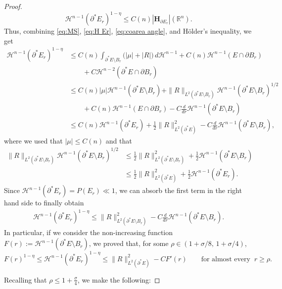 \documentclass[reqno,11pt]{amsart}
\def\sz{\sigma}
\newcommand{\R}{\mathbb R}
\numberwithin{equation}{section}
\theoremstyle{remark}
\begin{document}
\begin{proof}
\begin{equation}\label{eq:MS}
\mathscr H^{n-1}(\partial^*E_r)^{1-\eta}\le C(n)|\mathbf H_{\partial E_r}|(\R^n).    
\end{equation}
Thus, combining \eqref{eq:MS}, \eqref{eq:H Er}, \eqref{eq:coarea angle}, and 
H\"older's inequality, 
we get
\begin{align*}
\mathscr H^{n-1}(\partial^*E_r)^{1-\eta}
&\leq    C(n)\int_{\partial^*E\setminus B_{r}}\big(|\mu|+|R|\big)\, d\mathscr H^{n-1}+  C(n)\mathscr H^{n-1}(E\cap \partial B_{r})\\
&\qquad+ C  \mathscr H^{n-2}(\partial^*E\cap \partial B_{r}) \\
&\le  C(n)|\mu|\mathscr H^{n-1}(\partial^*E\setminus B_{r})+\|R\|_{L^2(\partial^*E\setminus B_{r})}\mathscr H^{n-1}(\partial^*E\setminus B_{r})^{1/2} \\
&\qquad+ C(n)\mathscr H^{n-1}(E\cap \partial B_r)-   C   \frac{d}{dr}\mathscr H^{n-1}\left(\partial^*E \setminus B_{r}\right)\\
&\leq C(n) \mathscr H^{n-1}(\partial^*E_r)+ \frac{1}2 \|R\|_{L^2(\partial^*E)}^2 -   C   \frac{d}{dr}\mathscr H^{n-1}\left(\partial^*E \setminus B_{r}\right),
\end{align*}
where we used that $|\mu|\leq C(n)$ and that
\begin{align*}
\|R\|_{L^2(\partial^*E\setminus B_{r})}\mathscr H^{n-1}(\partial^*E\setminus B_{r})^{1/2}
&\leq \frac12 \|R\|_{L^2(\partial^*E\setminus B_{r})}^2+\frac12 \mathscr H^{n-1}(\partial^*E\setminus B_{r})\\
& \leq 
\frac12 \|R\|_{L^2(\partial^*E)}^2+\frac12
\mathscr H^{n-1}(\partial^*E_r).
\end{align*}
Since $\mathscr H^{n-1}(\partial^*E_r)=P(E_r)\ll 1$, we can absorb the first term in the right hand side to finally obtain
\begin{align*}
\mathscr H^{n-1}(\partial^*E_r)^{1-\eta}\leq \|R\|_{L^2(\partial^*E\setminus B_{r})}^2 -   C\frac{d}{dr}\mathscr H^{n-1}\left(\partial^*E \setminus B_{r}\right).
\end{align*}
In particular, if we consider the non-increasing function $F(r):=\mathscr H^{n-1}\left(\partial^*E \setminus B_{r}\right)$, we proved that, for  some $\rho\in (1+\sz/8,\,1+\sz/4)$, 
$$F(r)^{1-\eta}\le\mathscr H^{n-1}(\partial^*E_r)^{1-\eta}\le  \|R\|^2_{L^2(\partial^*E)} -  C  F'(r)
\qquad \text{for almost every } \ r \geq \rho.$$
 



Recalling that $\rho \leq 1+\frac\sigma{4}$, we make the following:


\end{proof}
\end{document}
